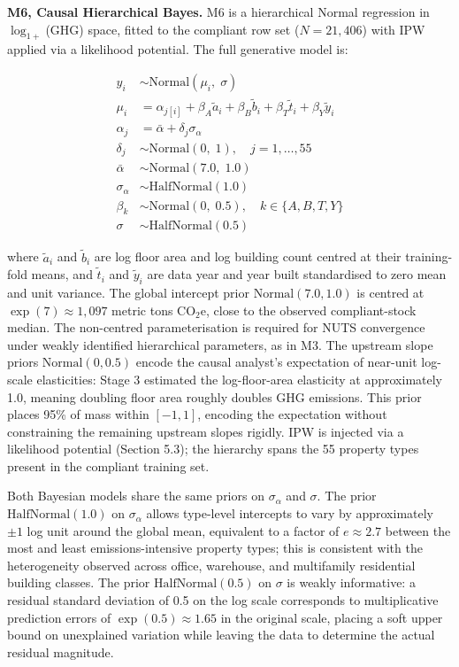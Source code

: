 \textbf{M6, Causal Hierarchical Bayes.} M6 is a hierarchical Normal regression in $\log_{1+}$(GHG) space, fitted to the compliant row set ($N = 21{,}406$) with IPW applied via a likelihood potential. The full generative model is:

\[
\begin{aligned}
y_i &\sim \text{Normal}(\mu_i,\; \sigma) \\
\mu_i &= \alpha_{j[i]} + \beta_A \tilde{a}_i + \beta_B \tilde{b}_i + \beta_T \tilde{t}_i + \beta_Y \tilde{y}_i \\
\alpha_j &= \bar{\alpha} + \delta_j \sigma_\alpha \\
\delta_j &\sim \text{Normal}(0,\; 1), \quad j = 1, \ldots, 55 \\
\bar{\alpha} &\sim \text{Normal}(7.0,\; 1.0) \\
\sigma_\alpha &\sim \text{HalfNormal}(1.0) \\
\beta_k &\sim \text{Normal}(0,\; 0.5), \quad k \in \{A, B, T, Y\} \\
\sigma &\sim \text{HalfNormal}(0.5)
\end{aligned}
\]

where $\tilde{a}_i$ and $\tilde{b}_i$ are log floor area and log building count centred at their training-fold means, and $\tilde{t}_i$ and $\tilde{y}_i$ are data year and year built standardised to zero mean and unit variance. The global intercept prior $\text{Normal}(7.0, 1.0)$ is centred at $\exp(7) \approx 1{,}097$ metric tons CO$_2$e, close to the observed compliant-stock median. The non-centred parameterisation is required for NUTS convergence under weakly identified hierarchical parameters, as in M3. The upstream slope priors $\text{Normal}(0, 0.5)$ encode the causal analyst's expectation of near-unit log-scale elasticities: Stage 3 estimated the log-floor-area elasticity at approximately 1.0, meaning doubling floor area roughly doubles GHG emissions. This prior places 95\% of mass within $[-1, 1]$, encoding the expectation without constraining the remaining upstream slopes rigidly. IPW is injected via a likelihood potential (Section 5.3); the hierarchy spans the 55 property types present in the compliant training set.

Both Bayesian models share the same priors on $\sigma_\alpha$ and $\sigma$. The prior $\text{HalfNormal}(1.0)$ on $\sigma_\alpha$ allows type-level intercepts to vary by approximately $\pm 1$ log unit around the global mean, equivalent to a factor of $e \approx 2.7$ between the most and least emissions-intensive property types; this is consistent with the heterogeneity observed across office, warehouse, and multifamily residential building classes. The prior $\text{HalfNormal}(0.5)$ on $\sigma$ is weakly informative: a residual standard deviation of 0.5 on the log scale corresponds to multiplicative prediction errors of $\exp(0.5) \approx 1.65$ in the original scale, placing a soft upper bound on unexplained variation while leaving the data to determine the actual residual magnitude.

